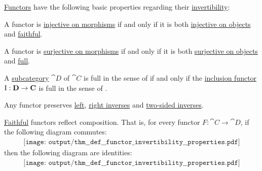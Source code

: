 \begin{proposition}\label{thm:def:functor_invertibility/properties}
  \hyperref[def:functor]{Functors} have the following basic properties regarding their \hyperref[def:functor_invertibility]{invertibility}:

  \begin{thmenum}
     A functor is \hyperref[def:functor_invertibility/injective_on_morphisms]{injective on morphisms} if and only if it is both \hyperref[def:functor_invertibility/injective_on_objects]{injective on objects} and \hyperref[def:functor_invertibility/faithful]{faithful}.

     A functor is \hyperref[def:functor_invertibility/surjective_on_morphisms]{surjective on morphisms} if and only if it is both \hyperref[def:functor_invertibility/surjective_on_objects]{surjective on objects} and \hyperref[def:functor_invertibility/full]{full}.

     A \hyperref[def:subcategory]{subcategory} \( \cat{D} \) of \( \cat{C} \) is full in the sense of  if and only if the \hyperref[def:subcategory]{inclusion functor} \( \operatorname{I}: \operatorname{\mathbf{D}} \to \operatorname{\mathbf{C}} \) is full in the sense of .

     Any functor preserves \hyperref[def:morphism_invertibility/left]{left}, \hyperref[def:morphism_invertibility/right]{right inverses} and \hyperref[def:morphism_invertibility/isomorphism]{two-sided inverses}.

     \hyperref[def:functor_invertibility/faithful]{Faithful} functors reflect composition. That is, for every functor \( F: \cat{C} \to \cat{D} \), if the following diagram commutes:
    \begin{equation}\label{eq:thm:def:functor_invertibility/faithful_reflects_composition/image}
      \begin{aligned}
        \texttt{[image: output/thm\_\_def\_\_functor\_invertibility\_\_properties.pdf]}
      \end{aligned}
    \end{equation}
    then the following diagram are identities:
    \begin{equation}\label{eq:thm:def:functor_invertibility/faithful_reflects_composition/source}
      \begin{aligned}
        \texttt{[image: output/thm\_\_def\_\_functor\_invertibility\_\_properties.pdf]}
      \end{aligned}
    \end{equation}


\end{thmenum}
\end{proposition}
